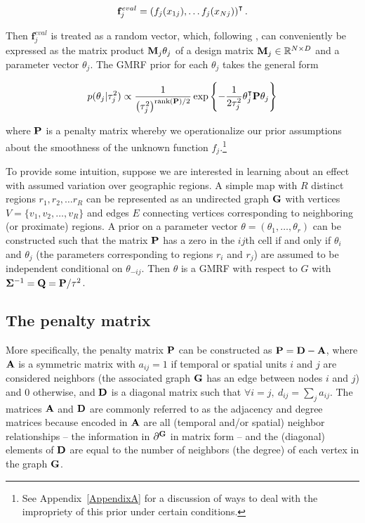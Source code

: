 \begin{equation*}
\mathbf{f}_j^{eval} = \left(f_j(x_{1j}), \dots f_j(x_{Nj})\right)^\intercal.  
 \end{equation*}
 
\noindent Then $\mathbf{f}_j^{eval}$ is treated as a random vector, which, following 
, can conveniently be expressed as the matrix product 
$\mathbf{M}_j \theta_j$ of a design matrix $\mathbf{M}_j \in \mathbb{R}^{N \times D}$ and a 
parameter vector $\theta_j$. The GMRF prior for each $\theta_j$ takes the general form

\begin{equation*}
p(\theta_j | \tau^2_j) 
\propto 
\frac{1}{\left(\tau^2_j\right)^{{\rm rank}(\mathbf{P})/2} }
\exp{\left\{-\frac{1}{2\tau^2_j} \theta_j^\intercal \mathbf{P} \theta_j\right\}}
\end{equation*}

\noindent where $\mathbf{P}$ is a penalty matrix whereby we operationalize our prior assumptions 
about the smoothness of the unknown function $f_j$.\footnote{See Appendix~\ref{AppendixA} 
for a discussion of ways to deal with the impropriety of this prior under certain conditions.}

To provide some intuition, suppose we are interested in learning about an effect with assumed 
variation over geographic regions.  A simple map with $R$ distinct regions $r_1, r_2, \dots r_R$ can 
be represented as an undirected graph $\mathbf{G}$ with vertices $V = \{v_1, v_2, \dots, v_R\}$ and 
edges $E$ connecting vertices corresponding to neighboring (or proximate) regions. A prior on a 
parameter vector $\theta = (\theta_1, \dots, \theta_r)$ can be constructed such that the matrix 
$\mathbf{P}$ has a zero in the $ij$th cell if and only if $\theta_i$ and $\theta_j$ (the parameters 
corresponding to regions $r_i$ and $r_j$) are assumed to be independent conditional on 
$\theta_{-ij}$. Then $\theta$ is a GMRF with respect to $G$ with 
$\boldsymbol{\Sigma}^{-1} = \mathbf{Q} = \mathbf{P}/\tau^2$. 


\subsection{The penalty matrix} 
\label{penalty_matrix}

More specifically, the penalty matrix $\mathbf{P}$ can be constructed as  
$\mathbf{P} = \mathbf{D} - \mathbf{A}$, where $\mathbf{A}$ is a symmetric matrix with 
$a_{ij} = 1$ if temporal or spatial units $i$ and $j$ are considered neighbors 
(the associated graph $\mathbf{G}$ has an edge between nodes $i$ and $j$) and 
0 otherwise, and $\mathbf{D}$ is a diagonal matrix such that 
$\forall i = j, \: d_{ij} = \sum_j a_{ij}$. The matrices $\mathbf{A}$ and $\mathbf{D}$ are 
commonly referred to as the adjacency and degree matrices because encoded in 
$\mathbf{A}$ are all (temporal and/or spatial) neighbor relationships -- the information 
in $\partial^{\mathbf{G}}$ in matrix form -- and the (diagonal) elements of $\mathbf{D}$ 
are equal to the number of neighbors (the degree) of each vertex in the 
graph $\mathbf{G}$. 

